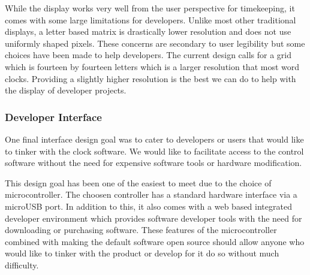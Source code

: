 \documentclass[10pt,draftclsnofoot,onecolumn]{IEEEtran}
\begin{document}
While the display works very well from the user perspective for timekeeping, it comes with some large limitations for developers.
Unlike most other traditional displays, a letter based matrix is drastically lower resolution and does not use uniformly shaped pixels.
These concerns are secondary to user legibility but some choices have been made to help developers.
The current design calls for a grid which is fourteen by fourteen letters which is a larger resolution that most word clocks.
Providing a slightly higher resolution is the best we can do to help with the display of developer projects.

\subsubsection{Developer Interface}

One final interface design goal was to cater to developers or users that would like to tinker with the clock software.
We would like to facilitate access to the control software without the need for expensive software tools or hardware modification.

This design goal has been one of the easiest to meet due to the choice of microcontroller.
The choosen controller has a standard hardware interface via a microUSB port. 
In addition to this, it also comes with a web based integrated developer environment which provides software developer tools with the need for downloading or purchasing software.
These features of the microcontroller combined with making the default software open source should allow anyone who would like to tinker with the product or develop for it do so without much difficulty.
\end{document}
